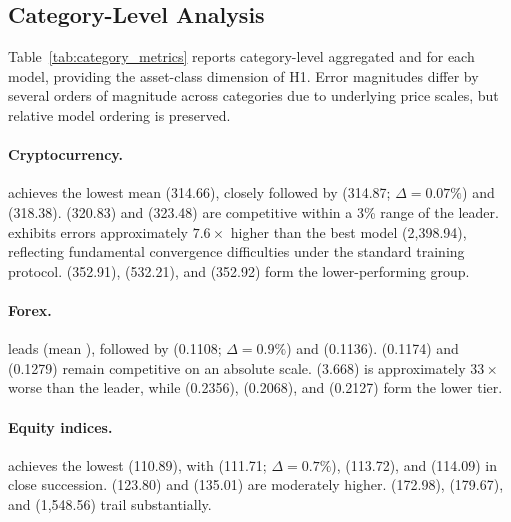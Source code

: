 \subsection{Category-Level Analysis}
\label{sec:category_analysis}

Table~\ref{tab:category_metrics} reports category-level aggregated \rmse and \mae for each model, providing the asset-class dimension of H1.  Error magnitudes differ by several orders of magnitude across categories due to underlying price scales, but relative model ordering is preserved.



\paragraph{Cryptocurrency.}
\moderntcn achieves the lowest mean \rmse (314.66), closely followed by \patchtst (314.87; $\Delta = 0.07\%$) and \timexer (318.38).  \itransformer (320.83) and \dlinear (323.48) are competitive within a 3\% range of the leader.  \lstm exhibits errors approximately $7.6\times$ higher than the best model (2{,}398.94), reflecting fundamental convergence difficulties under the standard training protocol.  \nhits (352.91), \autoformer (532.21), and \timesnet (352.92) form the lower-performing group.

\paragraph{Forex.}
\moderntcn leads (mean ), followed by \patchtst (0.1108; $\Delta = 0.9\%$) and \itransformer (0.1136).  \timexer (0.1174) and \dlinear (0.1279) remain competitive on an absolute scale.  \lstm (3.668) is approximately $33\times$ worse than the leader, while \nhits (0.2356), \autoformer (0.2068), and \timesnet (0.2127) form the lower tier.

\paragraph{Equity indices.}
\moderntcn achieves the lowest \rmse (110.89), with \patchtst (111.71; $\Delta = 0.7\%$), \itransformer (113.72), and \timexer (114.09) in close succession.  \dlinear (123.80) and \nhits (135.01) are moderately higher.  \timesnet (172.98), \autoformer (179.67), and \lstm (1{,}548.56) trail substantially.

